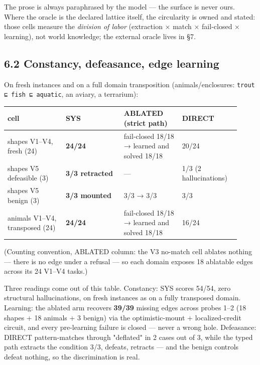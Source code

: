 \documentclass[11pt]{article}
\begin{document}
The prose is always paraphrased by the model — the surface is never ours. Where the oracle is the declared lattice itself, the circularity is owned and stated: those cells measure the \emph{division of labor} (extraction × match × fail-closed × learning), not world knowledge; the external oracle lives in §7.

\subsection*{6.2 Constancy, defeasance, edge learning}

On fresh instances and on a full domain transposition (animals/enclosures: \texttt{trout ⊑ fish ⊑ aquatic}, an aviary, a terrarium):

\begin{center}\small\begin{tabular}{p{0.23\linewidth}p{0.23\linewidth}p{0.23\linewidth}p{0.23\linewidth}}\toprule
cell & SYS & ABLATED (strict path) & DIRECT \\ \midrule
shapes V1–V4, fresh (24) & \textbf{24/24} & fail-closed 18/18 → learned and solved 18/18 & 20/24 \\
shapes V5 defeasible (3) & \textbf{3/3 retracted} & — & 1/3 (2 hallucinations) \\
shapes V5 benign (3) & \textbf{3/3 mounted} & 3/3 → 3/3 & 3/3 \\
animals V1–V4, transposed (24) & \textbf{24/24} & fail-closed 18/18 → learned and solved 18/18 & 16/24 \\
\bottomrule\end{tabular}\end{center}

(Counting convention, ABLATED column: the V3 no-match cell ablates nothing — there is no edge under a refusal — so each domain exposes 18 ablatable edges across its 24 V1–V4 tasks.)

Three readings come out of this table. Constancy: SYS scores 54/54, zero structural hallucinations, on fresh instances as on a fully transposed domain. Learning: the ablated arm recovers \textbf{39/39} missing edges across probes 1–2 (18 shapes + 18 animals + 3 benign) via the optimistic-mount + localized-credit circuit, and every pre-learning failure is closed — never a wrong hole. Defeasance: DIRECT pattern-matches through "deflated" in 2 cases out of 3, while the typed path extracts the condition 3/3, defeats, retracts — and the benign controls defeat nothing, so the discrimination is real.
\end{document}

